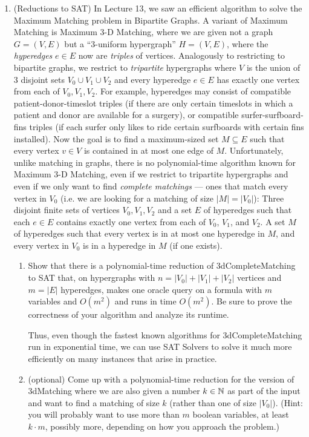 \documentclass[11pt]{article}
\begin{document}
\begin{enumerate}
\item (Reductions to SAT) In Lecture 13, we saw an efficient algorithm to solve the Maximum Matching problem in Bipartite Graphs. A variant of Maximum Matching is Maximum 3-D Matching, where we are given not a graph $G=(V,E)$ but a ``3-uniform hypergraph'' $H=(V,E)$, where the {\em hyperedges} $e\in E$ now are {\em triples} of vertices.  
Analogously to restricting to bipartite graphs, we restrict to {\em tripartite} hypergraphs where $V$ is the union of 3 disjoint sets $V_0\cup V_1 \cup V_2$ and every hyperedge $e\in E$ has exactly one vertex from each of $V_0,V_1,V_2$. For example, hyperedges may consist of 
compatible patient-donor-timeslot triples (if there are only certain timeslots in which a patient and donor are available for a surgery), 
or compatible surfer-surfboard-fins triples (if each surfer only likes to ride certain surfboards with certain fins installed).
Now the goal is to find a maximum-sized set $M\subseteq E$ such that every vertex $v\in V$ is contained in at most one edge of $M$.  
Unfortunately, unlike matching in graphs, there is no polynomial-time algorithm known for Maximum 3-D Matching, even if we restrict to tripartite hypergraphs and even if we only want to find {\em complete matchings} --- ones that match every vertex in $V_0$ (i.e. we are looking for a matching of size $|M|=|V_0|$):
{Three disjoint finite sets of vertices $V_0,V_1,V_2$ and a set $E$ of hyperedges  such that each $e\in E$ contains exactly one vertex from each of $V_0$, $V_1$, and $V_2$.}
{A set $M$ of hyperedges such that every vertex is in at most one hyperedge in $M$, and every vertex in $V_0$ is in a hyperedge in $M$ (if one exists).
}
\begin{enumerate}
\item Show that there is a polynomial-time reduction of 3dCompleteMatching to SAT that, on hypergraphs with $n=|V_0|+|V_1|+|V_2|$ vertices and $m=|E|$ hyperedges, makes one oracle query on a formula with $m$ variables and $O(m^2)$ and runs in time $O(m^2)$.  Be sure to prove the correctness of your algorithm and analyze its runtime.  

Thus, even though the fastest known algorithms for 3dCompleteMatching run in exponential time, we can use SAT Solvers to solve it much more efficiently on many instances that arise in practice. 

\item (optional) Come up with a polynomial-time reduction for the version of 3dMatching where we are also given a number $k\in \mathbb{N}$ as part of the input and want to find a matching of size $k$ (rather than one of size $|V_0|$).  (Hint: you will probably want to use more than $m$ boolean variables, at least $k\cdot m$, possibly more, depending on how you approach the problem.)


\end{enumerate}
\end{enumerate}
\end{document}

